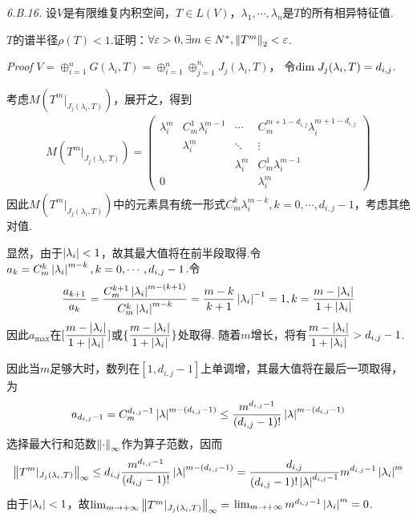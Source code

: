 \textit{6.B.16.}
设\(V\)是有限维复内积空间，\(T \in L(V)\)，\(\lambda_1,\cdots,\lambda_n\)是\(T\)的所有相异特征值.

\(T\)的谱半径\(\rho(T)<1\).证明：\(\forall \varepsilon>0,\exists m \in N^*,\left\lVert T^m \right\rVert_2<\varepsilon\).

\textit{Proof}
\(V=\oplus_{i=1}^n G(\lambda_i,T)=\oplus_{i=1}^n\oplus_{j=1}^{n_i} J_j(\lambda_i,T)\)，
令\(\mathrm{dim \;} J_j(\lambda_i,T)=d_{i,j}\).

考虑\(M(T^m|_{J_j(\lambda_i,T)})\)，展开之，得到
    \begin{align*}
        M(T^m|_{J_j(\lambda_i,T)})=
        \begin{pmatrix}
            \lambda_i^m & C_m^1 \lambda_i^{m-1} & \cdots      & C_m^{m+1-d_{i,j}} \lambda_i^{m+1-d_{i,j}} \\
                        & \lambda_i^m           & \ddots      & \vdots                                    \\
                        &                       & \lambda_i^m & C_m^1 \lambda_i^{m-1}                     \\
                 0      &                       &             & \lambda_i^m
        \end{pmatrix}
    \end{align*}
因此\(M(T^m|_{J_j(\lambda_i,T)})\)中的元素具有统一形式\(C_m^k \lambda_i^{m-k},k=0,\cdots,d_{i,j}-1\)，考虑其绝对值.

显然，由于\(\left\lvert \lambda_i \right\rvert<1\)，故其最大值将在前半段取得.令\(a_k=C_m^k \left\lvert \lambda_i \right\rvert^{m-k},k=0,\cdots,d_{i,j}-1\).令
    \begin{align*}
        \dfrac{a_{k+1}}{a_k}=\dfrac{C_m^{k+1}\left\lvert \lambda_i \right\rvert^{m-(k+1)}}{C_m^k \left\lvert \lambda_i \right\rvert^{m-k}}=
        \dfrac{m-k}{k+1} \left\lvert \lambda_i \right\rvert^{-1}=1,k=\dfrac{m-\left\lvert \lambda_i \right\rvert}{1+\left\lvert \lambda_i \right\rvert}
    \end{align*}
因此\(a_{\max}\)在\([\dfrac{m-\left\lvert \lambda_i \right\rvert}{1+\left\lvert \lambda_i \right\rvert}]\)或\(\{\dfrac{m-\left\lvert \lambda_i \right\rvert}{1+\left\lvert \lambda_i \right\rvert}\}\)处取得.
随着\(m\)增长，将有\(\dfrac{m-\left\lvert \lambda_i \right\rvert}{1+\left\lvert \lambda_i \right\rvert}>d_{i,j}-1\).

因此当\(m\)足够大时，数列在\([1,d_{i,j}-1]\)上单调增，其最大值将在最后一项取得，为
    \begin{align*}
        a_{d_{i,j}-1}=C_m^{d_{i,j}-1}\left\lvert \lambda \right\rvert^{m-(d_{i,j}-1)} \leq 
        \dfrac{m^{d_{i,j}-1}}{(d_{i,j}-1)!}\left\lvert \lambda \right\rvert^{m-(d_{i,j}-1)}
    \end{align*}
选择最大行和范数\(\left\lVert \cdot \right\rVert_{\infty}\)作为算子范数，因而
    \begin{align*}
        \left\lVert T^m|_{J_j(\lambda_i,T)} \right\rVert_{\infty} \leq d_{i,j}\dfrac{m^{d_{i,j}-1}}{(d_{i,j}-1)!}\left\lvert \lambda \right\rvert^{m-(d_{i,j}-1)}
        =\dfrac{d_{i,j}}{(d_{i,j}-1)! \left\lvert \lambda \right\rvert^{d_{i,j}-1}}m^{d_{i,j}-1}\left\lvert \lambda_i \right\rvert^m
    \end{align*}
由于\(\left\lvert \lambda_i \right\rvert<1\)，故\(\lim_{m \rightarrow +\infty}\left\lVert T^m|_{J_j(\lambda_i,T)} \right\rVert_{\infty}=\)
\(\lim_{m \rightarrow +\infty}m^{d_{i,j}-1}\left\lvert \lambda_i \right\rvert^m=0\).

